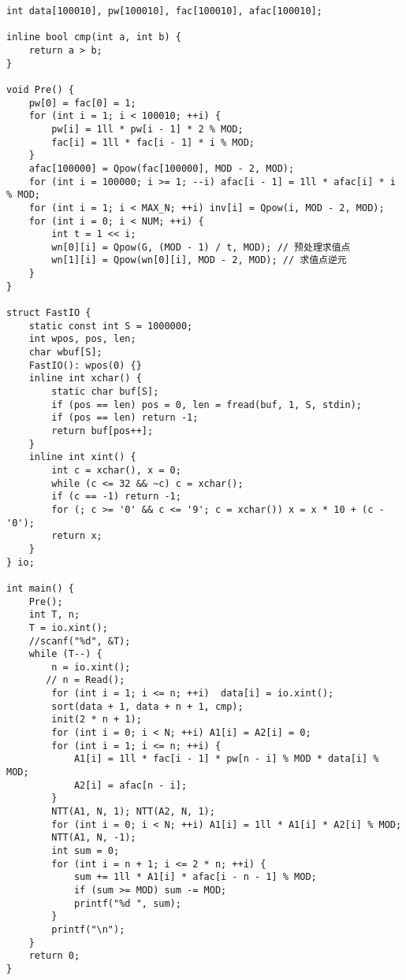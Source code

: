 \begin{lstlisting}
int data[100010], pw[100010], fac[100010], afac[100010];

inline bool cmp(int a, int b) {
    return a > b;
}

void Pre() {
    pw[0] = fac[0] = 1;
    for (int i = 1; i < 100010; ++i) {
        pw[i] = 1ll * pw[i - 1] * 2 % MOD;
        fac[i] = 1ll * fac[i - 1] * i % MOD;
    }
    afac[100000] = Qpow(fac[100000], MOD - 2, MOD);
    for (int i = 100000; i >= 1; --i) afac[i - 1] = 1ll * afac[i] * i % MOD;
    for (int i = 1; i < MAX_N; ++i) inv[i] = Qpow(i, MOD - 2, MOD);
    for (int i = 0; i < NUM; ++i) {
        int t = 1 << i;
        wn[0][i] = Qpow(G, (MOD - 1) / t, MOD); // 预处理求值点
        wn[1][i] = Qpow(wn[0][i], MOD - 2, MOD); // 求值点逆元
    }
}

struct FastIO {
    static const int S = 1000000;
    int wpos, pos, len;
    char wbuf[S];
    FastIO(): wpos(0) {}
    inline int xchar() {
        static char buf[S];
        if (pos == len) pos = 0, len = fread(buf, 1, S, stdin);
        if (pos == len) return -1;
        return buf[pos++];
    }
    inline int xint() {
        int c = xchar(), x = 0;
        while (c <= 32 && ~c) c = xchar();
        if (c == -1) return -1;
        for (; c >= '0' && c <= '9'; c = xchar()) x = x * 10 + (c - '0');
        return x;
    }
} io;

int main() {
    Pre();
    int T, n;
    T = io.xint();
    //scanf("%d", &T);
    while (T--) {
        n = io.xint();
       // n = Read();
        for (int i = 1; i <= n; ++i)  data[i] = io.xint();
        sort(data + 1, data + n + 1, cmp);
        init(2 * n + 1);
        for (int i = 0; i < N; ++i) A1[i] = A2[i] = 0;
        for (int i = 1; i <= n; ++i) {
            A1[i] = 1ll * fac[i - 1] * pw[n - i] % MOD * data[i] % MOD;
            A2[i] = afac[n - i];
        }
        NTT(A1, N, 1); NTT(A2, N, 1);
        for (int i = 0; i < N; ++i) A1[i] = 1ll * A1[i] * A2[i] % MOD;
        NTT(A1, N, -1);
        int sum = 0;
        for (int i = n + 1; i <= 2 * n; ++i) {
            sum += 1ll * A1[i] * afac[i - n - 1] % MOD;
            if (sum >= MOD) sum -= MOD;
            printf("%d ", sum);
        }
        printf("\n");
    }
    return 0;
}
\end{lstlisting}

